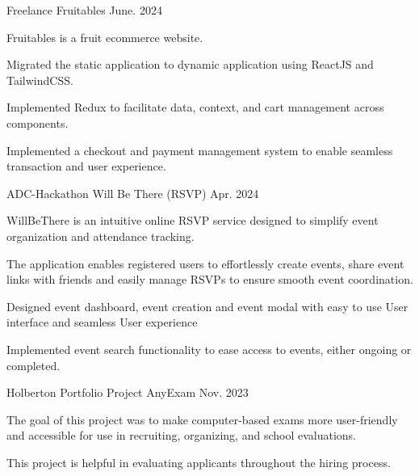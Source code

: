 \begin{cventries}
  \cventry
  {Freelance} %
  {Fruitables } %
  {} %
  {June. 2024} %
  {
    \begin{cvitems} %
      \item {Fruitables is a fruit ecommerce website.}
      \item {Migrated the static application to dynamic application using ReactJS and TailwindCSS.}
      \item {Implemented Redux to facilitate data, context, and cart management across components.}
      \item {Implemented a checkout and payment management system to enable seamless transaction and user experience.}
    \end{cvitems}
  }
  \cventry
  {ADC-Hackathon} %
  {Will Be There (RSVP) } %
  {} %
  {Apr. 2024} %
  {
    \begin{cvitems} %
      \item {WillBeThere is an intuitive online RSVP service designed to simplify event organization and attendance tracking.}
      \item {The application enables registered users to effortlessly create events, share event links with friends and easily manage RSVPs to ensure smooth event coordination.}
      \item {Designed event dashboard, event creation and event modal with easy to use User interface and seamless User experience}
      \item {Implemented event search functionality to ease access to events, either ongoing or completed.}
    \end{cvitems}
  }
  \cventry
  {Holberton Portfolio Project} %
  {AnyExam } %
  {} %
  {Nov. 2023} %
  {
    \begin{cvitems} %
      \item {The goal of this project was to make computer-based exams more user-friendly and accessible for use in recruiting, organizing, and school evaluations. }
      \item {This project is helpful in evaluating applicants throughout the hiring process.}
    \end{cvitems}
  }


\end{cventries}
